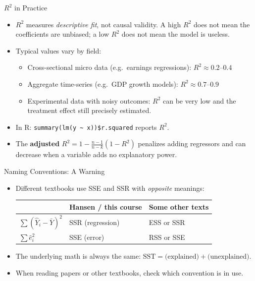 \documentclass[aspectratio=169, handout]{beamer}
\numberwithin{equation}{section}
\begin{document}
\begin{frame}{$R^2$ in Practice}
\begin{itemize}
\item $R^2$ measures \emph{descriptive fit}, not causal validity. A high $R^2$ does not mean the coefficients are unbiased; a low $R^2$ does not mean the model is useless.\pause
\item Typical values vary by field:
\begin{itemize}
\item Cross-sectional micro data (e.g.\ earnings regressions): $R^2\approx 0.2$--$0.4$
\item Aggregate time-series (e.g.\ GDP growth models): $R^2\approx 0.7$--$0.9$
\item Experimental data with noisy outcomes: $R^2$ can be very low and the treatment effect still precisely estimated.
\end{itemize}\pause
\item In R: \texttt{summary(lm(y \~{} x))\$r.squared} reports $R^2$.
\item The \textbf{adjusted} $R^2=1-\frac{n-1}{n-k}(1-R^2)$ penalizes adding regressors and can decrease when a variable adds no explanatory power.
\end{itemize}
\end{frame}

\begin{frame}{Naming Conventions: A Warning}
\begin{itemize}
\item Different textbooks use SSE and SSR with \emph{opposite} meanings:
\begin{center}
\begin{tabular}{lll}
& \textbf{Hansen / this course} & \textbf{Some other texts}\\
\hline
$\sum(\hat{Y}_i-\bar{Y})^2$ & SSR (regression) & ESS or SSR\\
$\sum \hat{e}_i^2$ & SSE (error) & RSS or SSE\\
\end{tabular}
\end{center}\pause
\item The underlying math is always the same: $\text{SST}=\text{(explained)} + \text{(unexplained)}$.
\item When reading papers or other textbooks, check which convention is in use.
\end{itemize}
\end{frame}
\end{document}
